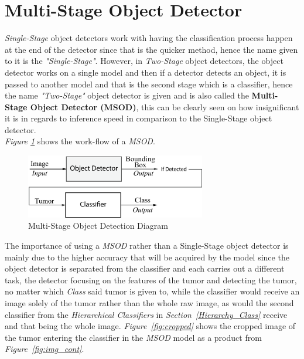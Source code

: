 \documentclass[12pt]{extarticle}
\begin{document}
	\section{Multi-Stage Object Detector}\label{Meth}
	\emph{Single-Stage} object detectors work with having the classification process happen at the end of the detector since that is the quicker method, hence the name given to it is the \emph{"Single-Stage"}. However, in \emph{Two-Stage} object detectors, the object detector works on a single model and then if a detector detects an object, it is passed to another model and that is the second stage which is a classifier, hence the name \emph{"Two-Stage"} object detector is given and is also called the \textbf{Multi-Stage Object Detector (MSOD)}, this can be clearly seen on how insignificant it is in regards to inference speed in comparison to the Single-Stage object detector.\\[5mm]
	\emph{Figure \ref{fig:Multi-Stage Obj Detector}} shows the work-flow of a \emph{MSOD}.\\[5mm]
	\begin{figure}[h]
		\centering
		\includegraphics[width=0.7\textwidth]{pics/Figures/Hierarchical_Obj_Det_Block_Diagram.eps}
		\caption{\small{Multi-Stage Object Detection Diagram}}
		\label{fig:Multi-Stage Obj Detector}
	\end{figure}
	The importance of using a \emph{MSOD} rather than a Single-Stage object detector is mainly due to the higher accuracy that will be acquired by the model since the object detector is separated from the classifier and each carries out a different task, the detector focusing on the features of the tumor and detecting the tumor, no matter which \emph{Class} said tumor is given to, while the classifier would receive an image solely of the tumor rather than the whole raw image, as would the second classifier from the \emph{Hierarchical Classifiers} in \emph{Section~\ref{Hierarchy_Class}} receive and that being the whole image. \emph{Figure~\ref{fig:cropped}} shows the cropped image of the tumor entering the classifier in the \emph{MSOD} model as a product from \emph{Figure~\ref{fig:img_cont}}.
\end{document}
